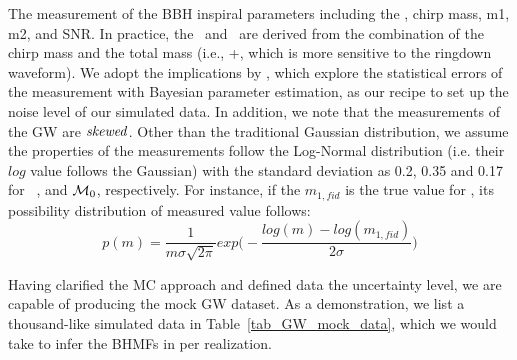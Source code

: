 \documentclass[twocolumn]{aastex62}
\begin{document}
The measurement of the BBH inspiral parameters including the \dl, chirp mass, m1, m2, and SNR. In practice, the \mone\ and \mtwo\ are derived from the combination of the chirp mass and the total mass (i.e., \mone+\mtwo, which is more sensitive to the ringdown waveform). We adopt the implications by \citet{Ghosh2016}, which explore the statistical errors of the measurement with Bayesian parameter estimation, as our recipe to set up the noise level of our simulated data.  In addition, we note that the measurements of the GW are ${\it skewed}$. Other than the traditional Gaussian distribution, we assume the properties of the measurements follow the Log-Normal distribution (i.e. their $log$ value follows the Gaussian) with the standard deviation as 0.2, 0.35 and 0.17 for \mone\ \dl, and ${\cal M}_0$, respectively. For instance, if the $m_{1,fid}$ is the true value for \mone, its possibility distribution of measured value follows:
 \begin{equation} \label{equ_lognorm}
p(m) = \frac{1}{m\sigma\sqrt{2\pi}} exp \big(- \frac{log(m)-log(m_{1,fid})}{2\sigma} \big) 
 \end{equation}

Having clarified the MC approach and defined data the uncertainty level, we are capable of producing the mock GW dataset. As a demonstration, we list a thousand-like simulated data in Table~\ref{tab_GW_mock_data}, which we would take to infer the BHMFs in per realization.
\end{document}
